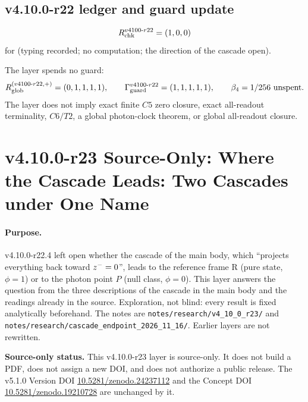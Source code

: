 \subsection*{v4.10.0-r22 ledger and guard update}
\label{subsec:v4100-r22-ledger-guard}

\[
R_{\rm chk}^{v4100\text{-}r22}=(1,0,0)
\]
for (typing recorded; no computation; the direction of the cascade open).

The layer spends no guard:
\[
R_{\rm glob}^{(v4100\text{-}r22,+)}=(0,1,1,1,1),
\qquad
\Gamma_{\rm guard}^{v4100\text{-}r22}=(1,1,1,1,1),
\qquad
\beta_4=1/256\ \text{unspent}.
\]
The layer does not imply exact finite \(C5\) zero closure, exact all-readout terminality, \(C6/T2\), a global photon-clock theorem,
or global all-readout closure.

\clearpage
\section*{v4.10.0-r23 Source-Only: Where the Cascade Leads: Two Cascades under One Name}
\label{sec:v4100-r23-cascade-endpoint}

\paragraph{Purpose.}
v4.10.0-r22.4 left open whether the cascade of the main body, which ``projects everything back toward \(z^-=0\)'', leads to the
reference frame R (pure state, \(\phi=1\)) or to the photon point \(P\) (null class, \(\phi=0\)).  This layer answers the question from the
three descriptions of the cascade in the main body and the readings already in the source.  Exploration, not blind: every result is
fixed analytically beforehand.  The notes are \texttt{notes/\allowbreak research/\allowbreak v4\_10\_0\_r23/} and
\texttt{notes/\allowbreak research/\allowbreak cascade\_endpoint\_2026\_11\_16/}.  Earlier layers are not rewritten.

\noindent\textbf{Source-only status.}
This v4.10.0-r23 layer is source-only.  It does not build a PDF, does not assign a new DOI,
and does not authorize a public release.  The v5.1.0 Version DOI
\href{https://doi.org/10.5281/zenodo.24237112}{10.5281/zenodo.24237112} and the Concept DOI
\href{https://doi.org/10.5281/zenodo.19210728}{10.5281/zenodo.19210728} are unchanged by it.

